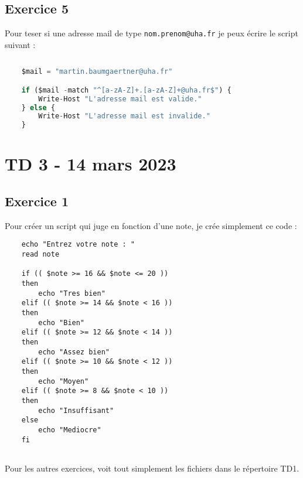 \documentclass[12pt, a4paper]{article}
\begin{document}
\subsection{Exercice 5}

Pour teser si une adresse mail de type \texttt{nom.prenom@uha.fr} je peux écrire le script suivant :

\begin{lstlisting}[language=Python]
    
    $mail = "martin.baumgaertner@uha.fr"

    if ($mail -match "^[a-zA-Z]+.[a-zA-Z]+@uha.fr$") {
        Write-Host "L'adresse mail est valide."
    } else {
        Write-Host "L'adresse mail est invalide."
    }

\end{lstlisting}

\newpage
\section{TD 3 - 14 mars 2023}

\subsection{Exercice 1}
Pour créer un script qui juge en fonction d'une note, je crée simplement 
ce code : 
\begin{lstlisting}
    echo "Entrez votre note : "
    read note

    if (( $note >= 16 && $note <= 20 ))
    then
        echo "Tres bien"
    elif (( $note >= 14 && $note < 16 ))
    then
        echo "Bien"
    elif (( $note >= 12 && $note < 14 ))
    then
        echo "Assez bien"
    elif (( $note >= 10 && $note < 12 ))
    then
        echo "Moyen"
    elif (( $note >= 8 && $note < 10 ))
    then
        echo "Insuffisant"
    else
        echo "Mediocre"
    fi
    
\end{lstlisting}

Pour les autres exercices, voit tout simplement les fichiers dans le répertoire 
TD1. 
\end{document}
